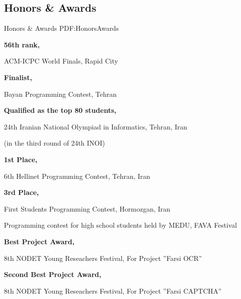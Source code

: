 \documentclass[a4paper,10pt,oneside]{article}
\begin{document}
\begin{body}

\section
{Honors\newline
\& Awards}
{Honors \& Awards}
{PDF:HonorsAwards}

{\textbf{56th rank,}}
\hfill
{}
\par
ACM-ICPC World Finals, Rapid City
\begin{detail}
\end{detail}

\EntryGap
{\textbf{Finalist,}}
\hfill
{}
\par
Bayan Programming Contest, Tehran
\begin{detail}
\end{detail}

\EntryGap
{\textbf{Qualified as the top 80 students,}}
\hfill
{}
\par
24th Iranian National Olympiad in Informatics, Tehran, Iran
\begin{detail}
(in the third round of 24th INOI)
\end{detail}

\EntryGap
{\textbf{1st Place,}}
\hfill
{}
\par
6th Hellinet Programming Contest, Tehran, Iran
\begin{detail}
\end{detail}

\EntryGap
{\textbf{3rd Place,}}
\hfill
{}
\par
First Students Programming Contest, Hormozgan, Iran
\begin{detail}
Programming contest for high school students held by MEDU, FAVA Festival
\end{detail}

\EntryGap
{\textbf{Best Project Award,}}
\hfill
{}
\par
8th NODET Young Reseachers Festival, For Project ”Farsi OCR”
\begin{detail}
\end{detail}

\EntryGap
{\textbf{Second Best Project Award,}}
\hfill
{}
\par
8th NODET Young Reseachers Festival, For Project ”Farsi CAPTCHA”
\begin{detail}
\end{detail}


\end{body}
\end{document}
